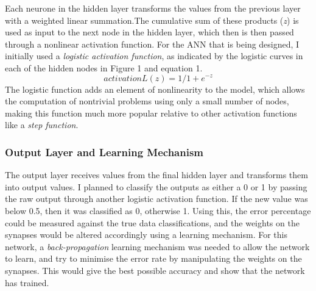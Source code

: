 \documentclass[11pt]{article}
\begin{document}
Each neurone in the hidden layer transforms the values from the previous layer with a weighted linear summation.The cumulative sum of these products (\textit{z}) is used as input to the next node in the hidden layer, which then is then passed through a nonlinear activation function. For the ANN that is being designed, I initially used a \textit{logistic activation function}, as indicated by the logistic curves in each of the hidden nodes in Figure 1 and equation 1. \begin{equation} activationL(z) = 1/1+e^{-z} \end{equation}
The logistic function adds an element of nonlinearity to the model, which allows the computation of nontrivial problems using only a small number of nodes, making this function much more popular relative to other activation functions like a \textit{step function}.
\subsubsection{Output Layer and Learning Mechanism}\label{subsubsec:output}
The output layer receives values from the final hidden layer and transforms them into output values. I planned to classify the outputs as either a 0 or 1 by passing the raw output through another logistic activation function. If the new value was below 0.5, then it was classified as 0, otherwise 1. Using this, the error percentage could be measured against the true data classifications, and the weights on the synapses would be altered accordingly using a learning mechanism. For this network, a \textit{back-propagation} learning mechanism was needed to allow the network to learn, and try to minimise the error rate by manipulating the weights on the synapses. This would give the best possible accuracy and show that the network has trained.\\
\end{document}
